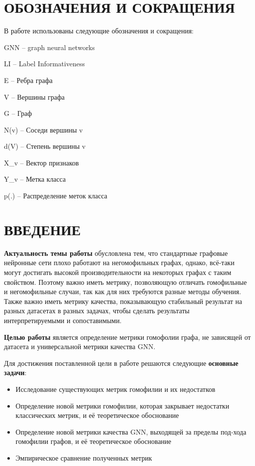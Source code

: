 \documentclass[a4paper,14pt]{article}
\begin{document}
    \newpage
    
	\section*{ \hfill ОБОЗНАЧЕНИЯ И СОКРАЩЕНИЯ \hfill}
	
	В работе  использованы следующие обозначения и сокращения:
	
	GNN	–	graph neural networks
	
	LI	–	Label Informativeness
	
	E	–	Ребра графа
	
	V	–	Вершины графа
	
	G	–	Граф
	
	N(v)	–	Соседи вершины v
	
	d(V)	–	Степень вершины v
	
	X\_v	–	Вектор признаков
	
	Y\_v	–	Метка класса 
	
	p(.)	–	Распределение меток класса
	
	\newpage
	
	\section*{ \hfill ВВЕДЕНИЕ \hfill}
	
	\textbf{Актуальность темы работы} обусловлена тем, что стандартные графовые нейронные сети плохо работают на негомофильных графах, однако, всё-таки могут достигать высокой производительности на некоторых графах с таким свойством.
	Поэтому важно иметь метрику, позволяющую отличать гомофильные и негомофильные случаи, так как для них требуются разные методы обучения.
	Также важно иметь метрику качества, показывающую стабильный результат на разных датасетах в разных задачах, чтобы сделать результаты интерпретируемыми и сопоставимыми. 
	
	\textbf{Целью работы} является определение метрики гомофолии графа, не зависящей от датасета и универсальной метрики качества GNN. 
	
	Для достижения поставленной цели в работе решаются следующие \textbf{основные задачи}:
	
	\begin{itemize}
		
	\item Исследование существующих метрик гомофилии и их недостатков
	
	\item Определение новой метрики гомофилии, которая закрывает недостатки классических метрик, и её теоретическое обоснование
	
	\item Определение новой метрики качества GNN, выходящей за пределы под-хода гомофилии графов, и её теоретическое обоснование
	
	\item Эмпирическое сравнение полученных метрик
	
	\end{itemize}
	
\end{document}
